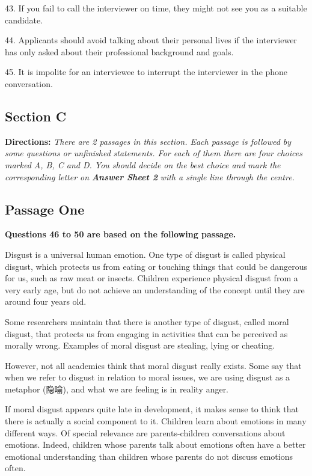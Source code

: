 \documentclass[UTF8,11pt]{ctexart}
\begin{document}
43. If you fail to call the interviewer on time, they might not see you as a suitable candidate.


44. Applicants should avoid talking about their personal lives if the interviewer has only asked about their professional background and goals.


45. It is impolite for an interviewee to interrupt the interviewer in the phone conversation.


\subsection*{\textbf{Section C}}


\textbf{Directions: }\textit{There are 2 passages in this section. Each passage is followed by some questions or unfinished} \textit{statements. For each of them there are four choices marked A, B, C and D. You should decide on the best choice and} \textit{mark the corresponding letter on }\textbf{\textit{Answer Sheet 2}}\textit{ with a single line through the centre.}


\subsection*{\textbf{Passage One}}


\textbf{Questions 46 to 50 are based on the following passage.}


Disgust is a universal human emotion. One type of disgust is called physical disgust, which protects us from eating or touching things that could be dangerous for us, such as raw meat or insects. Children experience physical disgust from a very early age, but do not achieve an understanding of the concept until they are around four years old.


Some researchers maintain that there is another type of disgust, called moral disgust, that protects us from engaging in activities that can be perceived as morally wrong. Examples of moral disgust are stealing, lying or cheating.


However, not all academics think that moral disgust really exists. Some say that when we refer to disgust in relation to moral issues, we are using disgust as a metaphor (隐喻), and what we are feeling is in reality anger.


If moral disgust appears quite late in development, it makes sense to think that there is actually a social component to it. Children learn about emotions in many different ways. Of special relevance are parents-children conversations about emotions. Indeed, children whose parents talk about emotions often have a better emotional understanding than children whose parents do not discuss emotions often.
\end{document}
